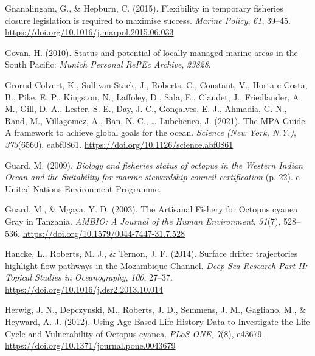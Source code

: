 \documentclass[
]{article}
\newlength{\cslhangindent}
\newlength{\cslentryspacingunit} %
\newenvironment{CSLReferences}[2] %
 {%
  \setlength{\parindent}{0pt}
  \ifodd #1
  \let\oldpar\par
  \def\par{\hangindent=\cslhangindent\oldpar}
  \fi
  \setlength{\parskip}{#2\cslentryspacingunit}
 }%
 {}
\begin{document}
\begin{CSLReferences}{1}{2}
\leavevmode{}%
Gnanalingam, G., \& Hepburn, C. (2015). Flexibility in temporary fisheries closure legislation is required to maximise success. \emph{Marine Policy}, \emph{61}, 39--45. \url{https://doi.org/10.1016/j.marpol.2015.06.033}

\leavevmode{}%
Govan, H. (2010). Status and potential of locally-managed marine areas in the {South} {Pacific}: \emph{Munich Personal RePEc Archive}, \emph{23828}.

\leavevmode{}%
Grorud-Colvert, K., Sullivan-Stack, J., Roberts, C., Constant, V., Horta e Costa, B., Pike, E. P., Kingston, N., Laffoley, D., Sala, E., Claudet, J., Friedlander, A. M., Gill, D. A., Lester, S. E., Day, J. C., Gonçalves, E. J., Ahmadia, G. N., Rand, M., Villagomez, A., Ban, N. C., \ldots{} Lubchenco, J. (2021). The {MPA} {Guide}: {A} framework to achieve global goals for the ocean. \emph{Science (New York, N.Y.)}, \emph{373}(6560), eabf0861. \url{https://doi.org/10.1126/science.abf0861}

\leavevmode{}%
Guard, M. (2009). \emph{Biology and fisheries status of octopus in the {Western} {Indian} {Ocean} and the {Suitability} for marine stewardship council certification} (p. 22). e United Nations Environment Programme.

\leavevmode{}%
Guard, M., \& Mgaya, Y. D. (2003). The {Artisanal} {Fishery} for {Octopus} cyanea {Gray} in {Tanzania}. \emph{AMBIO: A Journal of the Human Environment}, \emph{31}(7), 528--536. \url{https://doi.org/10.1579/0044-7447-31.7.528}

\leavevmode{}%
Hancke, L., Roberts, M. J., \& Ternon, J. F. (2014). Surface drifter trajectories highlight flow pathways in the {Mozambique} {Channel}. \emph{Deep Sea Research Part II: Topical Studies in Oceanography}, \emph{100}, 27--37. \url{https://doi.org/10.1016/j.dsr2.2013.10.014}

\leavevmode{}%
Herwig, J. N., Depczynski, M., Roberts, J. D., Semmens, J. M., Gagliano, M., \& Heyward, A. J. (2012). Using {Age}-{Based} {Life} {History} {Data} to {Investigate} the {Life} {Cycle} and {Vulnerability} of {Octopus} cyanea. \emph{PLoS ONE}, \emph{7}(8), e43679. \url{https://doi.org/10.1371/journal.pone.0043679}


\end{CSLReferences}
\end{document}
